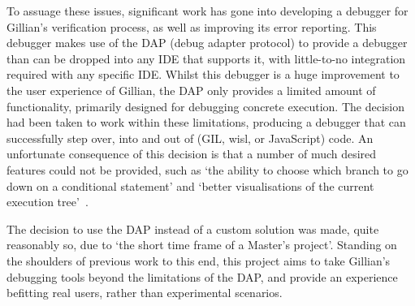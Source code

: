 To assuage these issues, significant work has gone into developing a debugger
for Gillian's verification process, as well as improving its error reporting.
This debugger makes use of the DAP (debug adapter protocol) to provide a
debugger than can be dropped into any IDE that supports it, with little-to-no
integration required with any specific IDE. Whilst this debugger is a huge
improvement to the user experience of Gillian, the DAP only provides a limited
amount of functionality, primarily designed for debugging concrete execution.
The decision had been taken to work within these limitations, producing a
debugger that can successfully step over, into and out of (GIL, wisl, or
JavaScript) code. An unfortunate consequence of this decision is that a number
of much desired features could not be provided, such as `the ability to choose
which branch to go down on a conditional statement' and `better visualisations
of the current execution tree'~\cite[p.~49]{gillian-debugging-2021}.

The decision to use the DAP instead of a custom solution was made, quite
reasonably so, due to `the short time frame of a Master’s project'. Standing on
the shoulders of previous work to this end, this project aims to take Gillian's
debugging tools beyond the limitations of the DAP, and provide an experience
befitting real users, rather than experimental scenarios.
